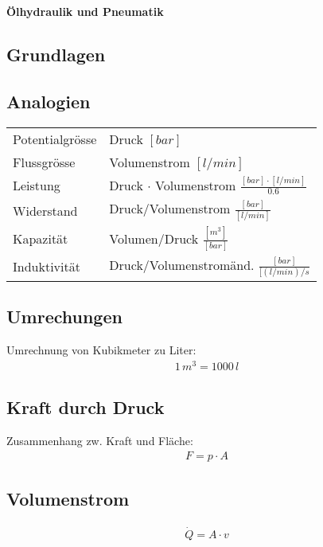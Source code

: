\documentclass[landscape,a4paper,10pt]{article}
\begin{document}
\sffamily

{{\huge\sffamily\bfseries Ölhydraulik und Pneumatik}}

\begin{multicols*}{3}






\section{Grundlagen}
\subsection{Analogien}
\begin{tabular}{ll}
Potentialgrösse & Druck $[bar]$ \\
Flussgrösse & Volumenstrom $[l/min]$ \\
Leistung & Druck $\cdot$ Volumenstrom $\frac{[bar] \cdot [l/min]}{0.6}$ \\
Widerstand & Druck/Volumenstrom $\frac{[bar]}{[l/min]}$ \\
Kapazität & Volumen/Druck $\frac{[m^3]}{[bar]}$ \\
Induktivität & Druck/Volumenstromänd. $\frac{[bar]}{[(l/min)/s}$
\end{tabular}
\subsection{Umrechungen}
Umrechnung von Kubikmeter zu Liter:
\begin{align*}
1\, m^3 = 1000 \, l
\end{align*}

\subsection{Kraft durch Druck}
Zusammenhang zw. Kraft und Fläche:
\begin{align*}
F = p \cdot A \tag{Kraft = Druck*Fläche}
\end{align*}

\subsection{Volumenstrom}
\begin{align*}
\dot{Q} = A \cdot v	
\end{align*}


\end{multicols*}
\end{document}
